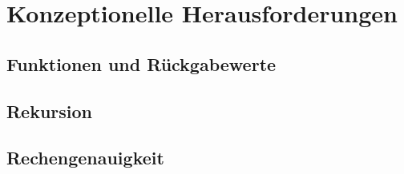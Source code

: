 \section{Konzeptionelle Herausforderungen}

\subsection{Funktionen und Rückgabewerte}

\subsection{Rekursion}

\subsection{Rechengenauigkeit}